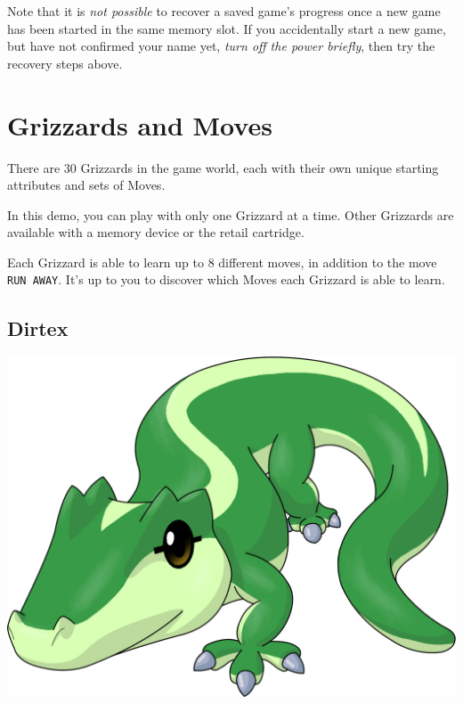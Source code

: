 \documentclass[10pt,twocolumn,openany,article]{memoir}
\begin{document}
Note that it  is \emph{not possible} to recover a  saved game's progress
once  a new  game has  been  started in  the  same memory  slot. If  you
accidentally start  a new game,  but have  not confirmed your  name yet,
\emph{turn off the power briefly}, then try the recovery steps above.

\fi

\fi %

\columnbreak
\chapter{Grizzards and Moves}
\label{ch:Grizzards}

There are  30 Grizzards in  the game world,  each with their  own unique
starting attributes and sets of Moves.

\ifdefined\NOSAVE

In  this  demo,  you  can  play  with  only  one  Grizzard  at  a  time.
Other   Grizzards  are   available   with  a   memory   device  or   the
retail cartridge.

\fi

Each Grizzard is able  to learn up to 8 different  moves, in addition to
the move \texttt{RUN AWAY}. It's up  to you to discover which Moves each
Grizzard is able to learn.

\ifdefined\DEMO\else

\section{Dirtex}

\includegraphics[width=\columnwidth]{../Manual/Dirtex.png}
\end{document}
